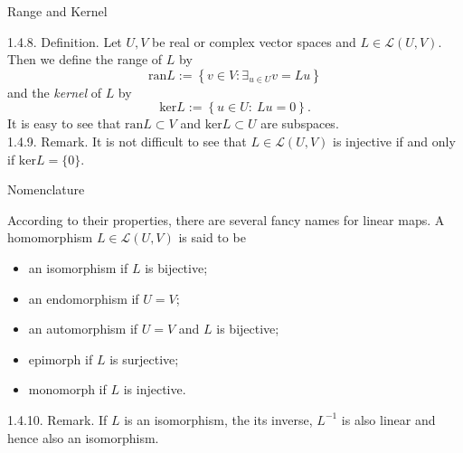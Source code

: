 \documentclass[smaller,hyperref={CJKbookmarks=true}]{beamer}
\begin{document}
\begin{frame}[c,shrink]{Range and Kernel}
\begin{spacing}{1.3}
\alert{1.4.8. Definition.} Let $U,V$ be real or complex vector spaces and $L\in\mathcal{L}(U,V)$. Then we define the range of $L$ by
\[\text{ran}L:=\left\{v\in V:\mathop{\exists}_{u\in U}v=Lu\right\}\]
and the \emph{kernel} of $L$ by
\[\text{ker}L:=\left\{u\in U:~Lu=0\right\}.\]
It is easy to see that $\text{ran}L\subset V$ and $\text{ker}L\subset U$ are subspaces.\\[11pt]
\alert{1.4.9. Remark.} It is not dif{}ficult to see that $L\in\mathcal{L}(U,V)$ is injective if and only if $\text{ker}L=\{0\}$.
\end{spacing}
\end{frame}
\begin{frame}[c]{Nomenclature}
\begin{spacing}{1.1}
According to their properties, there are several fancy names for linear
maps. A homomorphism $L\in\mathcal{L}(U,V)$ is said to be
\begin{itemize}
  \item an isomorphism if $L$ is bijective;
  \item an endomorphism if $U=V$;
  \item an automorphism if $U=V$ and $L$ is bijective;
  \item epimorph if $L$ is surjective;
  \item monomorph if $L$ is injective.
\end{itemize}
\alert{1.4.10. Remark.} If $L$ is an isomorphism, the its inverse, $L^{-1}$ is also linear and hence also an isomorphism.
\end{spacing}
\end{frame}
\end{document}
